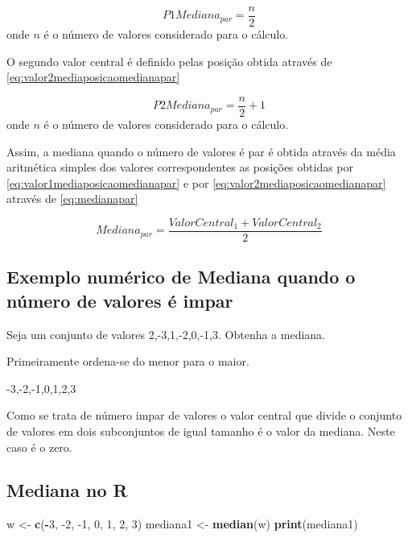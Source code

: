 \documentclass[
]{book}
\newenvironment{Shaded}{\begin{snugshade}}{\end{snugshade}}
\newcommand{\DecValTok}[1]{\textcolor[rgb]{0.00,0.00,0.81}{#1}}
\newcommand{\KeywordTok}[1]{\textcolor[rgb]{0.13,0.29,0.53}{\textbf{#1}}}
\newcommand{\NormalTok}[1]{#1}
\newcommand{\OperatorTok}[1]{\textcolor[rgb]{0.81,0.36,0.00}{\textbf{#1}}}
\newcommand{\StringTok}[1]{\textcolor[rgb]{0.31,0.60,0.02}{#1}}
\begin{document}
\begin{equation}
  P1Mediana_{par} = \dfrac{n}{2}
  \label{eq:valor1mediaposicaomedianapar}
\end{equation}
onde \(n\) é o número de valores considerado para o cálculo.

O segundo valor central é definido pelas posição obtida através de
\eqref{eq:valor2mediaposicaomedianapar}

\begin{equation}
  P2Mediana_{par} = \dfrac{n}{2} + 1
  \label{eq:valor2mediaposicaomedianapar}
\end{equation}
onde \(n\) é o número de valores considerado para o cálculo.

Assim, a mediana quando o número de valores é par é obtida através da média aritmética simples dos valores correspondentes as posições obtidas por \eqref{eq:valor1mediaposicaomedianapar} e por
\eqref{eq:valor2mediaposicaomedianapar} através de \eqref{eq:medianapar}

\begin{equation}
  Mediana_{par} = \dfrac{ValorCentral_1 + ValorCentral_2}{2}
  \label{eq:medianapar}
\end{equation}

\hypertarget{exemplo-numuxe9rico-de-mediana-quando-o-nuxfamero-de-valores-uxe9-impar}{%
\subsection{Exemplo numérico de Mediana quando o número de valores é impar}\label{exemplo-numuxe9rico-de-mediana-quando-o-nuxfamero-de-valores-uxe9-impar}}

Seja um conjunto de valores 2,-3,1,-2,0,-1,3. Obtenha a mediana.

Primeiramente ordena-se do menor para o maior.

-3,-2,-1,0,1,2,3

Como se trata de número impar de valores o valor central que divide o conjunto de valores em dois subconjuntos de igual tamanho é o valor da mediana. Neste caso é o zero.

\hypertarget{mediana-no-r}{%
\subsection{Mediana no R}\label{mediana-no-r}}

\begin{Shaded}
\begin{Highlighting}[]
\NormalTok{w <-}\StringTok{ }\KeywordTok{c}\NormalTok{(}\OperatorTok{-}\DecValTok{3}\NormalTok{, }\DecValTok{-2}\NormalTok{, }\DecValTok{-1}\NormalTok{, }\DecValTok{0}\NormalTok{, }\DecValTok{1}\NormalTok{, }\DecValTok{2}\NormalTok{, }\DecValTok{3}\NormalTok{)}
\NormalTok{mediana1 <-}\StringTok{ }\KeywordTok{median}\NormalTok{(w)}
\KeywordTok{print}\NormalTok{(mediana1)}
\end{Highlighting}
\end{Shaded}
\end{document}
